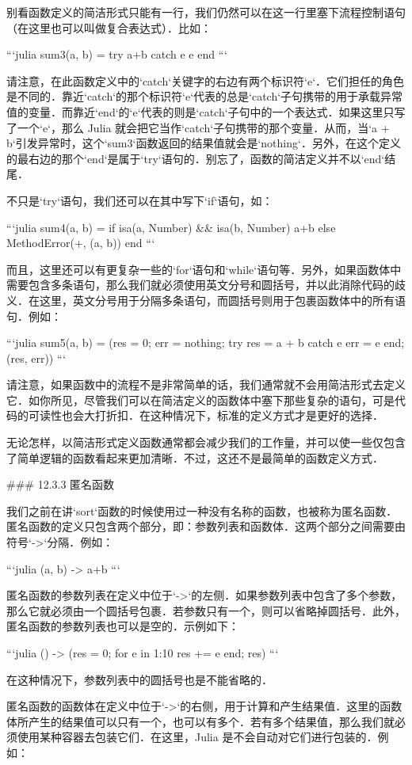 别看函数定义的简洁形式只能有一行，我们仍然可以在这一行里塞下流程控制语句（在这里也可以叫做复合表达式）．比如：

```julia
sum3(a, b) = try a+b catch e e end
```

请注意，在此函数定义中的`catch`关键字的右边有两个标识符`e`．它们担任的角色是不同的．靠近`catch`的那个标识符`e`代表的总是`catch`子句携带的用于承载异常值的变量．而靠近`end`的`e`代表的则是`catch`子句中的一个表达式．如果这里只写了一个`e`，那么 Julia 就会把它当作`catch`子句携带的那个变量．从而，当`a + b`引发异常时，这个`sum3`函数返回的结果值就会是`nothing`．另外，在这个定义的最右边的那个`end`是属于`try`语句的．别忘了，函数的简洁定义并不以`end`结尾．

不只是`try`语句，我们还可以在其中写下`if`语句，如：

```julia
sum4(a, b) = if isa(a, Number) && isa(b, Number) a+b else MethodError(+, (a, b)) end 
```

而且，这里还可以有更复杂一些的`for`语句和`while`语句等．另外，如果函数体中需要包含多条语句，那么我们就必须使用英文分号和圆括号，并以此消除代码的歧义．在这里，英文分号用于分隔多条语句，而圆括号则用于包裹函数体中的所有语句．例如：

```julia
sum5(a, b) = (res = 0; err = nothing; try res = a + b catch e err = e end; (res, err))
```

请注意，如果函数中的流程不是非常简单的话，我们通常就不会用简洁形式去定义它．如你所见，尽管我们可以在简洁定义的函数体中塞下那些复杂的语句，可是代码的可读性也会大打折扣．在这种情况下，标准的定义方式才是更好的选择．

无论怎样，以简洁形式定义函数通常都会减少我们的工作量，并可以使一些仅包含了简单逻辑的函数看起来更加清晰．不过，这还不是最简单的函数定义方式．

### 12.3.3 匿名函数

我们之前在讲`sort`函数的时候使用过一种没有名称的函数，也被称为匿名函数．匿名函数的定义只包含两个部分，即：参数列表和函数体．这两个部分之间需要由符号`->`分隔．例如：

```julia
(a, b) -> a+b
```

匿名函数的参数列表在定义中位于`->`的左侧．如果参数列表中包含了多个参数，那么它就必须由一个圆括号包裹．若参数只有一个，则可以省略掉圆括号．此外，匿名函数的参数列表也可以是空的．示例如下：

```julia
() -> (res = 0; for e in 1:10 res += e end; res)
```

在这种情况下，参数列表中的圆括号也是不能省略的．

匿名函数的函数体在定义中位于`->`的右侧，用于计算和产生结果值．这里的函数体所产生的结果值可以只有一个，也可以有多个．若有多个结果值，那么我们就必须使用某种容器去包装它们．在这里，Julia 是不会自动对它们进行包装的．例如：

